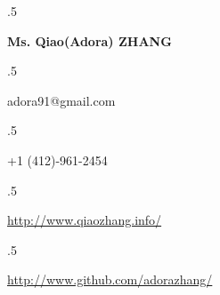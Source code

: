 


\hypersetup{backref,pdfpagemode=Full,colorlinks=true,urlcolor=black,backref}

\addtolength{\oddsidemargin}{-0.45in}
\addtolength{\voffset}{-0.30in}
\addtolength{\textwidth}{1.00in} \addtolength{\textheight}{1.50in}
\renewcommand{\namefont}{\LARGE\emph}




\def\Cplusplus{{\rm C\raise.5ex\hbox{\small ++}}}
\def\CSharp{{\rm C\raise.5ex\hbox{\small \#}}}
\def\first{{\raise.5ex\hbox{\small st}}}
\def\second{{\raise.5ex\hbox{\small nd}}}
\def\third{{\raise.5ex\hbox{\small rd}}}
\def\fourth{{\raise.5ex\hbox{\small th}}}






 \moveleft.5\hoffset\centerline{\large\bf Ms. Qiao(Adora) ZHANG}
 \moveleft.5\hoffset\centerline{adora91@gmail.com}
 \moveleft.5\hoffset\centerline{+1 (412)-961-2454}
 \moveleft.5\hoffset\centerline{\href{http://www.qiaozhang.info/}{http://www.qiaozhang.info/}}
 \moveleft.5\hoffset\centerline{\href{http://www.github.com/adorazhang/}{http://www.github.com/adorazhang/}}

